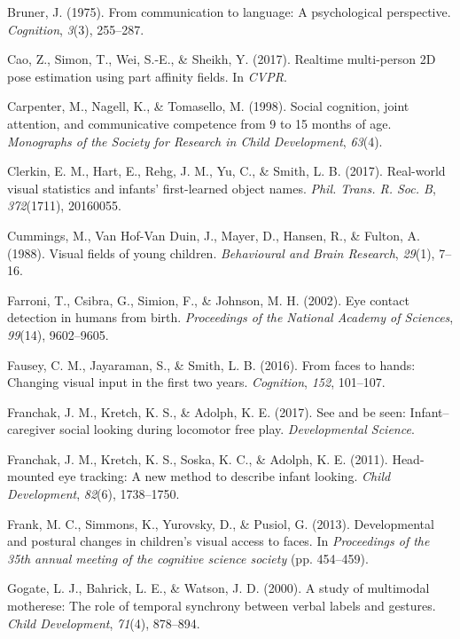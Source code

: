 \documentclass[english,man]{apa6}
\begin{document}
\hypertarget{ref-bruner1975}{}
Bruner, J. (1975). From communication to language: A psychological
perspective. \emph{Cognition}, \emph{3}(3), 255--287.

\hypertarget{ref-cao2017realtime}{}
Cao, Z., Simon, T., Wei, S.-E., \& Sheikh, Y. (2017). Realtime
multi-person 2D pose estimation using part affinity fields. In
\emph{CVPR}.

\hypertarget{ref-carpenter1998}{}
Carpenter, M., Nagell, K., \& Tomasello, M. (1998). Social cognition,
joint attention, and communicative competence from 9 to 15 months of
age. \emph{Monographs of the Society for Research in Child Development},
\emph{63}(4).

\hypertarget{ref-clerkin2017}{}
Clerkin, E. M., Hart, E., Rehg, J. M., Yu, C., \& Smith, L. B. (2017).
Real-world visual statistics and infants' first-learned object names.
\emph{Phil. Trans. R. Soc. B}, \emph{372}(1711), 20160055.

\hypertarget{ref-cummings1988}{}
Cummings, M., Van Hof-Van Duin, J., Mayer, D., Hansen, R., \& Fulton, A.
(1988). Visual fields of young children. \emph{Behavioural and Brain
Research}, \emph{29}(1), 7--16.

\hypertarget{ref-farroni2002eye}{}
Farroni, T., Csibra, G., Simion, F., \& Johnson, M. H. (2002). Eye
contact detection in humans from birth. \emph{Proceedings of the
National Academy of Sciences}, \emph{99}(14), 9602--9605.

\hypertarget{ref-fausey2016}{}
Fausey, C. M., Jayaraman, S., \& Smith, L. B. (2016). From faces to
hands: Changing visual input in the first two years. \emph{Cognition},
\emph{152}, 101--107.

\hypertarget{ref-franchak2017see}{}
Franchak, J. M., Kretch, K. S., \& Adolph, K. E. (2017). See and be
seen: Infant--caregiver social looking during locomotor free play.
\emph{Developmental Science}.

\hypertarget{ref-franchak2011}{}
Franchak, J. M., Kretch, K. S., Soska, K. C., \& Adolph, K. E. (2011).
Head-mounted eye tracking: A new method to describe infant looking.
\emph{Child Development}, \emph{82}(6), 1738--1750.

\hypertarget{ref-frank2013}{}
Frank, M. C., Simmons, K., Yurovsky, D., \& Pusiol, G. (2013).
Developmental and postural changes in children's visual access to faces.
In \emph{Proceedings of the 35th annual meeting of the cognitive science
society} (pp. 454--459).

\hypertarget{ref-gogate2000study}{}
Gogate, L. J., Bahrick, L. E., \& Watson, J. D. (2000). A study of
multimodal motherese: The role of temporal synchrony between verbal
labels and gestures. \emph{Child Development}, \emph{71}(4), 878--894.
\end{document}
